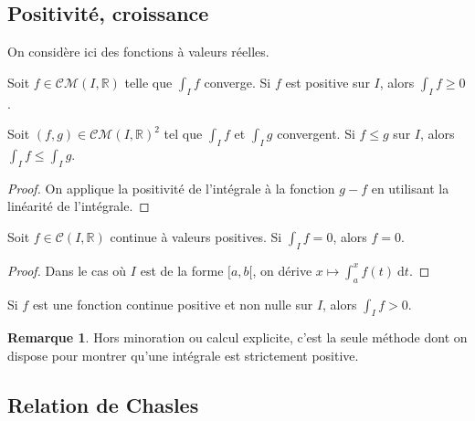 \documentclass[french]{article}
\newcommand{\R}{\mathbb{R}}
\renewcommand{\d}{\text{d}}
\theoremstyle{plain}
\theoremstyle{definition}
\newtheorem*{rmq}{Remarque}
\theoremstyle{remark}
\begin{document}
\subsection{Positivité, croissance}

On considère ici des fonctions à valeurs réelles.

\begin{prop}[Positivité]%
	Soit $f\in\mathcal{CM}(I,\R)$ telle que $\displaystyle\int_I f$ converge. Si $f$ est positive sur $I$, alors $\displaystyle\int_If\geqslant0$.
\end{prop}

\begin{prop}[Croissance]%
	Soit $(f,g)\in\mathcal{CM}(I,\R)^2$ tel que $\displaystyle\int_I f$ et $\displaystyle\int_I g$ convergent. Si $f\leqslant g$ sur $I$, alors $\displaystyle\int_If\leqslant\int_I g$.
\end{prop}
\begin{proof}
	On applique la positivité de l'intégrale à la fonction $g-f$ en utilisant la linéarité de l'intégrale.
\end{proof}

\begin{prop}
	Soit $f\in\mathcal{C}(I,\R)$ continue à valeurs positives. Si $\displaystyle\int_If=0$, alors $f=0$.
\end{prop}
\begin{proof}
	Dans le cas où $I$ est de la forme $[a,b[$, on dérive $x\mapsto\displaystyle\int_{a}^{x}f(t)\ \d t$.
\end{proof}

\begin{met}
	Si $f$ est une fonction continue positive et non nulle sur $I$, alors $\displaystyle\int_I f>0$.
\end{met}

\begin{rmq}
	Hors minoration ou calcul explicite, c'est la seule méthode dont on dispose pour montrer qu'une intégrale est strictement positive.
\end{rmq}

\subsection{Relation de Chasles}
\end{document}
